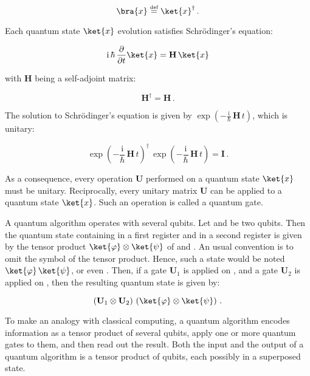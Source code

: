 \documentclass[11pt, a4paper]{article}
\begin{document}
                \[\bra{x}\overset{\text{\tiny{def}}}{=}\ket{x}^\dagger\,.\]
                
                Each quantum state \(\ket{x}\) evolution satisfies Schrödinger's equation:
                
                \[\mathrm{i}\,\hbar\,\frac{\partial}{\partial t}\ket{x} = \mathbf{H}\,\ket{x}\]
                
                with \(\mathbf{H}\) being a self-adjoint matrix:
                
                \[\mathbf{H}^\dagger=\mathbf{H}\,.\]
                
                The solution to Schrödinger's equation is given by \(\exp\left(-\frac{\mathrm{i}}{\hbar}\,\mathbf{H}\,t\right)\), which is unitary:
                
                \[\exp\left(-\frac{\mathrm{i}}{\hbar}\,\mathbf{H}\,t\right)^\dagger\,\exp\left(-\frac{\mathrm{i}}{\hbar}\,\mathbf{H}\,t\right) = \mathbf{I}\,.\]
                
                As a consequence, every operation \(\mathbf{U}\) performed on a quantum state \(\ket{x}\) must be unitary. Reciprocally, every unitary matrix \(\mathbf{U}\) can be applied to a quantum state \(\ket{x}\). Such an operation is called a quantum gate. 
                
                A quantum algorithm operates with several qubits. Let \ket{\varphi} and \ket{\psi} be two qubits. Then the quantum state containing \ket{\varphi} in a first register and \ket{\psi} in a second register is given by the tensor product \(\ket{\varphi}\otimes\ket{\psi}\) of \ket{\varphi} and . An usual convention is to omit the symbol of the tensor product. Hence, such a state would be noted \(\ket{\varphi}\,\ket{\psi}\), or even \ket{\phi\psi}. Then, if a gate \(\mathbf{U}_1\) is applied on \ket{\varphi}, and a gate \(\mathbf{U}_2\) is applied on \ket{\psi}, then the resulting quantum state is given by:
                
                \[\left(\mathbf{U}_1\otimes\mathbf{U}_2\right)\,\left(\ket{\varphi}\otimes\ket{\psi}\right)\,.\]
                
                To make an analogy with classical computing, a quantum algorithm encodes information as a tensor product of several qubits, apply one or more quantum gates to them, and then read out the result. Both the input and the output of a quantum algorithm is a tensor product of qubits, each possibly in a superposed state.
                
\end{document}
